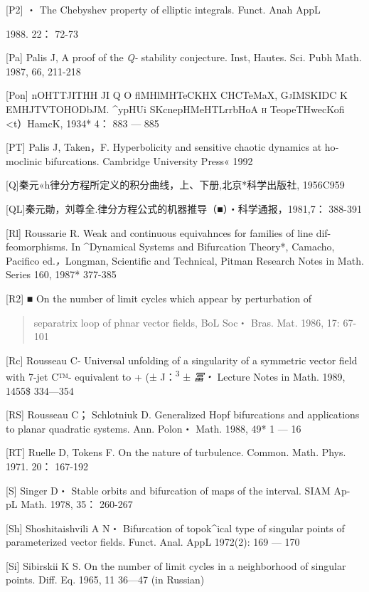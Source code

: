 {[}P2{]} ・ The Chebyshev property of elliptic integrals. Funct. Anah
AppL

1988. 22： 72-73

{[}Pa{]} Palis J, A proof of the \emph{Q-} stability conjecture. Inst,
Hautes. Sci. Pubh Math. 1987, 66, 211-218

{[}Pon{]} nOHTTJITHH JI Q O flMHlMHTeCKHX CHCTeMaX, \textsc{GjIMSKIDC} K
EMHJTVTOHODbJM. \^{}ypHUi SKcnepHMeHTLrrbHoA \textsc{h} TeopeTHwecKofi
\textless{}t）HamcK, 1934* 4： 883 --- 885

{[}PT{]} Palis J, Taken，F. Hyperbolicity and sensitive chaotic dynamics
at ho­moclinic bifurcations. Cambridge University Press« 1992

{[}Q{]}秦元«h律分方程所定义的积分曲线，上、下册,北京*科学出版社,
1956C959

{[}QL{]}秦元勛，刘尊全.律分方程公式的机器推导（■）・科学通报，1981,7：
388-391

{[}Rl{]} Roussarie R. Weak and continuous equivahnces for families of
line dif- feomorphisms. In \^{}Dynamical Systems and Bifurcation
Theory*, Cama­cho, Pacifico ed.\emph{，}Longman, Scientific and
Technical, Pitman Research Notes in Math. Series 160, 1987* 377-385

{[}R2{]} ■ On the number of limit cycles which appear by perturbation of

\begin{quote}
separatrix loop of phnar vector fields, BoL Soc・ Bras. Mat. 1986, 17:
67-101
\end{quote}

{[}Rc{]} Rousseau C- Universal unfolding of a singularity of a symmetric
vector field with 7-jet C™- equivalent to + (± J：\textsuperscript{3} ±
\emph{冨・} Lecture Notes in Math. 1989, 1455\$ 334---354

{[}RS{]} Rousseau C； Schlotniuk D. Generalized Hopf bifurcations and
applica­tions to planar quadratic systems. Ann. Polon・ Math. 1988, 49*
1 --- 16

{[}RT{]} Ruelle D, Tokens F. On the nature of turbulence. Common. Math.
Phys. 1971. 20： 167-192

{[}S{]} Singer D・ Stable orbits and bifurcation of maps of the
interval. SIAM Ap- pL Math. 1978, 35： 260-267

{[}Sh{]} Shoshitaishvili A N・ Bifurcation of topok\^{}ical type of
singular points of parameterized vector fields. Funct. Anal. AppL
1972(2): 169 --- 170

{[}Si{]} Sibirskii K S. On the number of limit cycles in a neighborhood
of singular points. Diff. Eq. 1965, 11 36---47 (in Russian)

